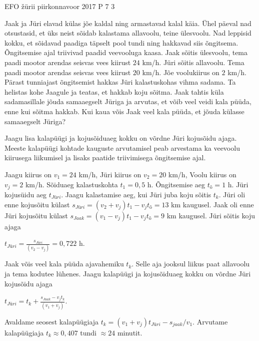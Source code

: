 {EFO žürii} %
{piirkonnavoor} %
{2017} %
{P 7} %
{3} %
{

\ifStatement
Jaak ja Jüri elavad külas jõe kaldal ning armastavad kalal käia. Ühel päeval nad otsustasid, et üks neist sõidab kalastama allavoolu, teine ülesvoolu. Nad leppisid kokku, et sõidavad paadiga täpselt pool tundi ning hakkavad siis õngitsema. Õngitsemise ajal triivivad paadid veevooluga kaasa. Jaak sõitis ülesvoolu, tema paadi mootor arendas seisvas vees kiirust $24$ km/h. Jüri sõitis allavoolu. Tema paadi mootor arendas seisvas vees kiirust $20$ km/h. Jõe voolukiirus on $2$ km/h. Pärast tunniajast õngitsemist hakkas Jüri kalastuskohas vihma sadama. Ta helistas kohe Jaagule ja teatas, et hakkab koju sõitma. Jaak tahtis küla sadamasillale jõuda samaaegselt Jüriga ja arvutas, et võib veel veidi kala püüda, enne kui sõitma hakkab. Kui kaua võis Jaak veel kala püüda, et jõuda külasse samaaegselt Jüriga?
\fi

\ifHint
Jaagu lisa kalapüügi ja kojusõiduaeg kokku on võrdne Jüri kojusõidu ajaga. Meeste kalapüügi kohtade kauguste arvutamisel peab arvestama ka veevoolu kiirusega liikumisel ja lisaks paatide triivimisega õngitsemise ajal.
\fi

\ifSolution
Jaagu kiirus on $v_1 = 24$ km/h,
\newline
Jüri kiirus on $v_2 = 20$ km/h,
\newline
Voolu kiirus on $v_j = 2$ km/h.
\newline
Sõiduaeg kalastuskohta $t_1 = 0,5$ h.
\newline
Õngitsemise aeg $t_{õ} = 1$ h.
\newline
Jüri kojusüidu aeg $t_{Jüri}$.
\newline
Jaagu kalastamise aeg, kui Jüri juba koju sõitis $t_k$.
\newline
Jüri oli enne kojusõitu külast $s_{Jüri} = (v_2 + v_j)t_1 - v_j t_{õ} = 13$ km kaugusel. 
\newline
Jaak oli enne Jüri kojusõitu külast $s_{Jaak} = (v_1 - v_j )t_1 - v_j t_{õ} = 9$ km kaugusel.
\newline
Jüri sõitis koju ajaga
\begin{center}
$t_{Jüri} = \frac{s_{Jüri}}{(v_2 - v_j)} = 0,722$ h. 
\end{center}
Jaak võis veel kala püüda ajavahemiku $t_k$. Selle aja jooksul liikus paat allavoolu ja tema kodutee lühenes. Jaagu kalapüügi ja kojusõiduaeg kokku on võrdne Jüri kojusõidu ajaga 
\begin{center}
$t_{Jüri} = t_k + \frac{s_{Jaak} - v_j t_k}{(v_1 + v_j)}$.
\end{center}
Avaldame seosest kalapüügiaja $t_k = (v_1 + v_j)t_{Jüri} - s_{jaak}/v_1$.
\newline
Arvutame kalapüügiaja $t_k \approx 0,407$ tundi $\approx 24$ minutit.
\fi
}